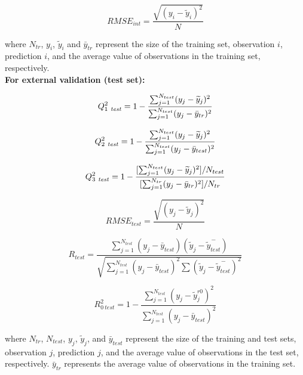 \documentclass[twoside,a4wide,10pt]{article}
\begin{document}
\begin{equation}
RMSE_{int} = \frac {\sqrt {(y_i - \widetilde{y}_i)^{2}}} {N}
\end{equation}

where $N_{tr}$, $y_i$, $\widetilde{y}_i$ and $\bar{y}_{tr}$ represent the size of the training set, observation $i$, prediction $i$, and the average value of observations in the training set, respectively. \\

{\bf For external validation (test set):}

\begin{equation}
Q_{1\ {\it test}}^{2} = 1 - \frac {\sum_{j=1}^{N_{test}} (y_j-\widetilde{y}_j)^{2}}  {\sum_{j=1}^{N_{test}} (y_j - \bar{y}_{tr})^{2}}
\end{equation}

\begin{equation}
Q_{2\ {\it test}}^{2} = 1 - \frac {\sum_{j=1}^{N_{test}} (y_j-\widetilde{y}_j)^{2}}  {\sum_{j=1}^{N_{test}} (y_j - \bar{y}_{test})^{2}}
\end{equation}

\begin{equation}
Q_{3\ {\it test}}^{2} = 1 - \frac {[\sum_{j=1}^{N_{test}} (y_j-\widetilde{y}_j)^{2}] / N_{test} }  {[ \sum_{j=1}^{N_{tr}} (y_j - \bar{y}_{tr})^{2}] / N_{tr}}
\end{equation}

\begin{equation}
RMSE_{test} = \frac {\sqrt {(y_j - \widetilde{y}_j)^{2}}} {N} 
\end{equation}

\begin{equation}
R_{test} = \frac {{\sum_{j=1}^{N_{test}} (y_{j} - \bar{y}_{test})}  (\widetilde{y}_{j} - \overset{-}{\widetilde{y}_{test}})} 
{\sqrt{\sum_{j=1}^{N_{test}} (y_{j} - \bar{y}_{test})^{2} \sum{ (\widetilde{y}_{j} - \overset{-}{\widetilde{y}_{test}})^{2}}}}
\end{equation}

\begin{equation}
R_{0\ test}^2 = 1 - \frac {\sum_{j=1}^{N_{test}} (y_{j} - \widetilde{y}_{j}^{ r0})^{2}} {\sum_{j=1}^{N_{test}} (y_{j} - \bar{y}_{test})^{2}} 
\end{equation}

where $N_{tr}$, $N_{test}$, $y_j$, $\widetilde{y}_j$, and $\bar{y}_{test}$ represent the size of the training and test sets, observation $j$, prediction $j$, and the average value of observations in the test set, respectively.
$\bar{y}_{tr}$ represents the average value of observations in the training set.\\
\end{document}
